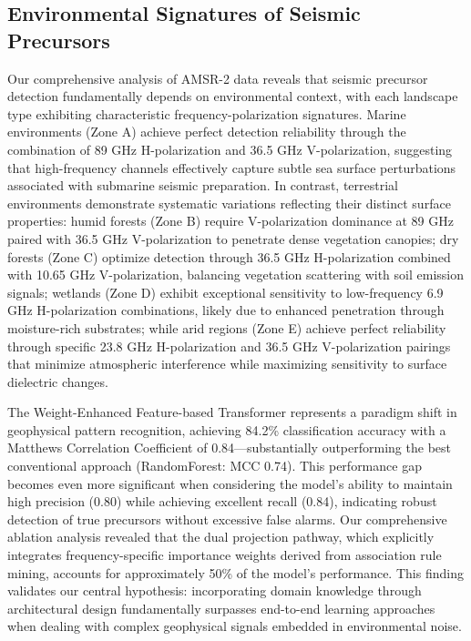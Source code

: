 \documentclass[fleqn,10pt]{wlscirep_mdpi_style}
\begin{document}
\subsection{Environmental Signatures of Seismic Precursors}
Our comprehensive analysis of AMSR-2 data reveals that seismic precursor detection fundamentally depends on environmental context, with each landscape type exhibiting characteristic frequency-polarization signatures. Marine environments (Zone A) achieve perfect detection reliability through the combination of 89 GHz H-polarization and 36.5 GHz V-polarization, suggesting that high-frequency channels effectively capture subtle sea surface perturbations associated with submarine seismic preparation. In contrast, terrestrial environments demonstrate systematic variations reflecting their distinct surface properties: humid forests (Zone B) require V-polarization dominance at 89 GHz paired with 36.5 GHz V-polarization to penetrate dense vegetation canopies; dry forests (Zone C) optimize detection through 36.5 GHz H-polarization combined with 10.65 GHz V-polarization, balancing vegetation scattering with soil emission signals; wetlands (Zone D) exhibit exceptional sensitivity to low-frequency 6.9 GHz H-polarization combinations, likely due to enhanced penetration through moisture-rich substrates; while arid regions (Zone E) achieve perfect reliability through specific 23.8 GHz H-polarization and 36.5 GHz V-polarization pairings that minimize atmospheric interference while maximizing sensitivity to surface dielectric changes.

The Weight-Enhanced Feature-based Transformer represents a paradigm shift in geophysical pattern recognition, achieving 84.2\% classification accuracy with a Matthews Correlation Coefficient of 0.84—substantially outperforming the best conventional approach (RandomForest: MCC 0.74). This performance gap becomes even more significant when considering the model's ability to maintain high precision (0.80) while achieving excellent recall (0.84), indicating robust detection of true precursors without excessive false alarms. Our comprehensive ablation analysis revealed that the dual projection pathway, which explicitly integrates frequency-specific importance weights derived from association rule mining, accounts for approximately 50\% of the model's performance. This finding validates our central hypothesis: incorporating domain knowledge through architectural design fundamentally surpasses end-to-end learning approaches when dealing with complex geophysical signals embedded in environmental noise.
\end{document}
